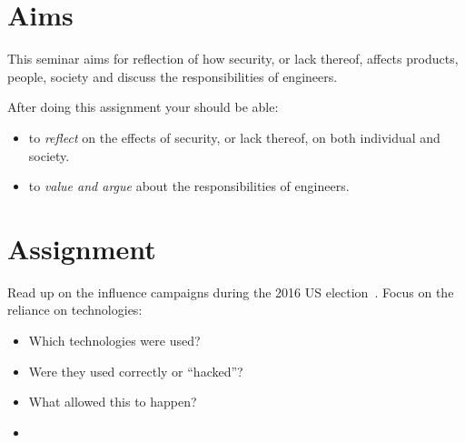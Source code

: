 \section{Aims}

This seminar aims for reflection of how security, or lack thereof, affects 
products, people, society and discuss the responsibilities of engineers.
\begin{frame}
After doing this assignment your should be able:
\begin{itemize}
  \item to \emph{reflect} on the effects of security, or lack thereof, on both 
    individual and society.
  \item to \emph{value and argue} about the responsibilities of engineers.
\end{itemize}
\end{frame}


\section{Assignment}%
\label{sec:Tasks}


Read up on the influence campaigns during the 2016 US 
election~\cite{inside-russian-influence-campaign}.
Focus on the reliance on technologies:
\begin{frame}
  \begin{itemize}
    \item Which technologies were used?
    \item Were they used correctly or \enquote{hacked}?
    \item What allowed this to happen?
    \item \Etc
  \end{itemize}
\end{frame}


